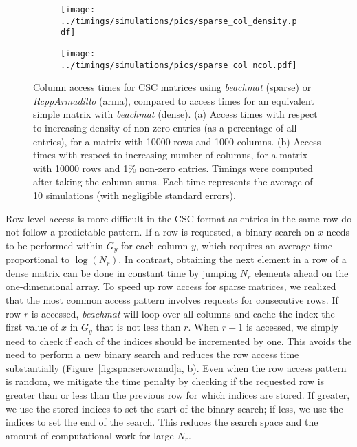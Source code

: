 \documentclass[10pt,letterpaper]{article}
\newcommand{\beachmat}{\textit{beachmat}}
\begin{document}
\begin{figure}[bt]
    \centering
    \begin{subfigure}[b]{0.49\textwidth}
        \texttt{[image: ../timings/simulations/pics/sparse\_col\_density.pdf]}
        \caption{}
    \end{subfigure}
    \begin{subfigure}[b]{0.49\textwidth}
        \texttt{[image: ../timings/simulations/pics/sparse\_col\_ncol.pdf]}
        \caption{}
    \end{subfigure}
    \caption{Column access times for CSC matrices using \beachmat{} (sparse) or \textit{RcppArmadillo} (arma), compared to access times for an equivalent simple matrix with \beachmat{} (dense).
        (a) Access times with respect to increasing density of non-zero entries (as a percentage of all entries), for a matrix with 10000 rows and 1000 columns.
        (b) Access times with respect to increasing number of columns, for a matrix with 10000 rows and 1\% non-zero entries.
        Timings were computed after taking the column sums.
        Each time represents the average of 10 simulations (with negligible standard errors).
    }
    \label{fig:sparsecol}
\end{figure}

Row-level access is more difficult in the CSC format as entries in the same row do not follow a predictable pattern.
If a row is requested, a binary search on $x$ needs to be performed within $G_y$ for each column $y$, which requires an average time proportional to $\log(N_r)$.
In contrast, obtaining the next element in a row of a dense matrix can be done in constant time by jumping $N_r$ elements ahead on the one-dimensional array.
To speed up row access for sparse matrices, we realized that the most common access pattern involves requests for consecutive rows.
If row $r$ is accessed, \beachmat{} will loop over all columns and cache the index the first value of $x$ in $G_y$ that is not less than $r$.
When $r+1$ is accessed, we simply need to check if each of the indices should be incremented by one.
This avoids the need to perform a new binary search and reduces the row access time substantially (Figure~\ref{fig:sparserowrand}a, b).
Even when the row access pattern is random, we mitigate the time penalty by checking if the requested row is greater than or less than the previous row for which indices are stored.
If greater, we use the stored indices to set the start of the binary search; if less, we use the indices to set the end of the search. 
This reduces the search space and the amount of computational work for large $N_r$.
\end{document}
